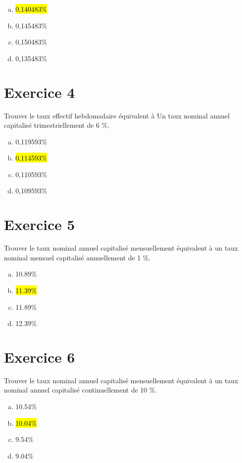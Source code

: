 \documentclass[10pt,a4paper]{article}
\begin{document}
\begin{enumerate}[a)]
\item \hl{0,140483\%}
\item 0,145483\%
\item 0,150483\%
\item 0,135483\%
\end{enumerate}

\section*{Exercice 4}
Trouver le taux effectif hebdomadaire équivalent à Un taux nominal annuel capitalisé trimestriellement de 6 \%.


\begin{enumerate}[a)]
\item 0,119593\%
\item \hl{0,114593\%}
\item 0,110593\%
\item 0,109593\%
\end{enumerate}


\section*{Exercice 5}
Trouver le taux nominal annuel capitalisé mensuellement équivalent à un taux nominal mensuel capitalisé annuellement de 1 \%.



\begin{enumerate}[a)]
\item 10.89\%
\item \hl{11.39\%}
\item 11.89\%
\item 12.39\%
\end{enumerate}


\section*{Exercice 6}
Trouver le taux nominal annuel capitalisé mensuellement équivalent à un taux nominal annuel capitalisé continuellement de 10 \%.



\begin{enumerate}[a)]
\item 10.54\%
\item \hl{10.04\%}
\item 9.54\%
\item 9.04\%
\end{enumerate}
\end{document}

